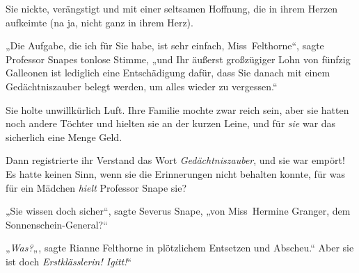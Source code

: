 Sie nickte, verängstigt und mit einer seltsamen Hoffnung, die in ihrem Herzen aufkeimte (na ja, nicht ganz in ihrem Herz).

„Die Aufgabe, die ich für Sie habe, ist sehr einfach, Miss~Felthorne“, sagte Professor Snapes tonlose Stimme, „und Ihr äußerst großzügiger Lohn von fünfzig Galleonen ist lediglich eine Entschädigung dafür, dass Sie danach mit einem Gedächtniszauber belegt werden, um alles wieder zu vergessen.“

Sie holte unwillkürlich Luft. Ihre Familie mochte zwar reich sein, aber sie hatten noch andere Töchter und hielten sie an der kurzen Leine, und für \emph{sie} war das sicherlich eine Menge Geld.

Dann registrierte ihr Verstand das Wort \emph{Gedächtniszauber}, und sie war empört! Es hatte keinen Sinn, wenn sie die Erinnerungen nicht behalten konnte, für was für ein Mädchen \emph{hielt} Professor Snape sie?

„Sie wissen doch sicher“, sagte Severus Snape, „von Miss~Hermine Granger, dem Sonnenschein-General?“

„\emph{Was?}„, sagte Rianne Felthorne in plötzlichem Entsetzen und Abscheu.“ Aber sie ist doch \emph{Erstklässlerin! Igitt!}“

